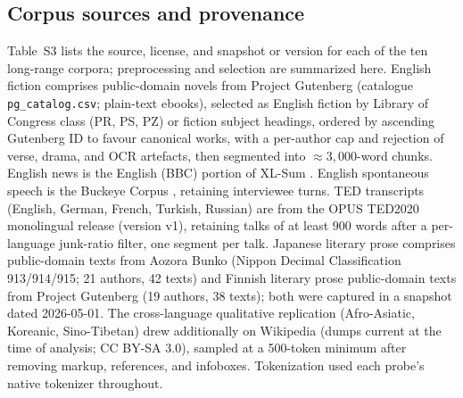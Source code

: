 \documentclass[11pt]{article}
\begin{document}
\subsection*{Corpus sources and provenance}

Table~S3 lists the source, license, and snapshot or version for each of the ten long-range corpora;
preprocessing and selection are summarized here. English fiction comprises public-domain novels from
Project Gutenberg (catalogue \texttt{pg\_catalog.csv}; plain-text ebooks), selected as English fiction
by Library of Congress class (PR, PS, PZ) or fiction subject headings, ordered by ascending Gutenberg
ID to favour canonical works, with a per-author cap and rejection of verse, drama, and OCR artefacts,
then segmented into ${\approx}3{,}000$-word chunks. English news is the English (BBC) portion of XL-Sum
\citep{hasan2021xlsum}. English spontaneous speech is the Buckeye Corpus \citep{pitt2007buckeye,
pitt2005buckeye}, retaining interviewee turns. TED transcripts (English, German, French, Turkish,
Russian) are from the OPUS TED2020 monolingual release \citep{reimers2020making, tiedemann2012parallel}
(version v1), retaining talks of at least $900$ words after a per-language junk-ratio filter, one
segment per talk. Japanese literary prose comprises public-domain texts from Aozora Bunko (Nippon
Decimal Classification 913/914/915; 21 authors, 42 texts) and Finnish literary prose public-domain
texts from Project Gutenberg (19 authors, 38 texts); both were captured in a snapshot dated
2026-05-01. The cross-language qualitative replication (Afro-Asiatic, Koreanic, Sino-Tibetan) drew
additionally on Wikipedia (dumps current at the time of analysis; CC BY-SA 3.0), sampled at a
500-token minimum after removing markup, references, and infoboxes. Tokenization used each probe's
native tokenizer throughout.
\end{document}
